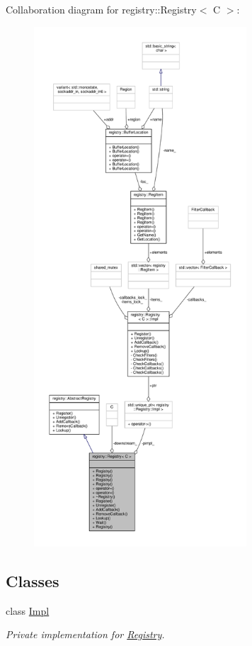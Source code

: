 Collaboration diagram for registry\+:\+:Registry$<$ C $>$\+:\nopagebreak
\begin{figure}[H]
\begin{center}
\leavevmode
\includegraphics[height=550pt]{classregistry_1_1Registry__coll__graph}
\end{center}
\end{figure}
\subsection*{Classes}
\begin{DoxyCompactItemize}
\item 
class \hyperlink{classregistry_1_1Registry_1_1Impl}{Impl}
\begin{DoxyCompactList}\small\item\em Private implementation for \hyperlink{classregistry_1_1Registry}{Registry}. \end{DoxyCompactList}\end{DoxyCompactItemize}
